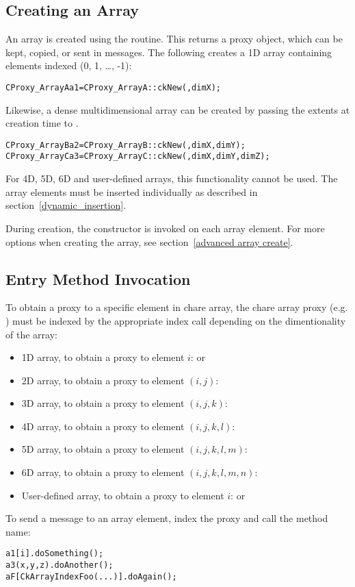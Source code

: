 \subsection{Creating an Array}
\label{basic array creation}

An array is created using the  routine. This returns a
proxy object, which can be kept, copied, or sent in messages. The following
creates a 1D array containing elements indexed (0, 1, \ldots,
-1):
%
\begin{alltt}
CProxy_ArrayA a1 = CProxy_ArrayA::ckNew(, dimX);
\end{alltt}
%
Likewise, a dense multidimensional array can be created by passing the extents
at creation time to .
%
\begin{alltt}
CProxy_ArrayB a2 = CProxy_ArrayB::ckNew(, dimX, dimY);
CProxy_ArrayC a3 = CProxy_ArrayC::ckNew(, dimX, dimY, dimZ);
\end{alltt}
%
For 4D, 5D, 6D and user-defined arrays, this functionality cannot be used.  The
array elements must be inserted individually as described in
section~\ref{dynamic_insertion}.

During creation, the constructor is invoked on each array element. For more
options when creating the array, see section~\ref{advanced array create}.

\subsection{Entry Method Invocation}

To obtain a proxy to a specific element in chare array, the chare array proxy
(e.g. ) must be indexed by the appropriate index call depending
on the dimentionality of the array:
%
\begin{itemize}
\item 1D array, to obtain a proxy to element $i$:  or
\item 2D array, to obtain a proxy to element $(i,j)$: 
\item 3D array, to obtain a proxy to element $(i,j,k)$: 
\item 4D array, to obtain a proxy to element $(i,j,k,l)$:
\item 5D array, to obtain a proxy to element $(i,j,k,l,m)$:
\item 6D array, to obtain a proxy to element $(i,j,k,l,m,n)$:
\item User-defined array, to obtain a proxy to element $i$: 
  or 
\end{itemize}
%
To send a  message to an array element, index the proxy
and call the method name:
%
\begin{alltt}
a1[i].doSomething();
a3(x,y,z).doAnother();
aF[CkArrayIndexFoo(...)].doAgain();
\end{alltt}

